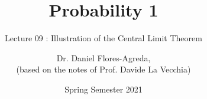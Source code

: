 \documentclass[notes=show,smaller]{beamer}\usepackage[]{graphicx}\usepackage[]{color}
\title[S110015]{Probability 1}
\subtitle{Lecture 09 : Illustration of the Central Limit Theorem}
\author[Flores-Agreda, La Vecchia]{Dr. Daniel Flores-Agreda, \\[0.5em] \tiny{(based on the notes of Prof. Davide La Vecchia)}}
\date{Spring Semester 2021}
\newtheorem{proposition}{Proposition}[section]
\renewcommand{\Pr}{P}
\begin{document}
\begin{frame}
  \titlepage
\end{frame}




%
%
%
%
%

\end{document}
